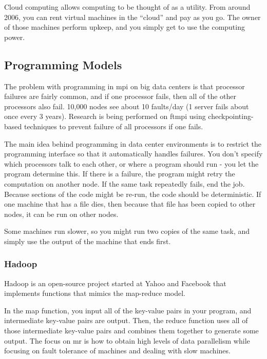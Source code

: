 \documentclass[10pt]{article}
\newcounter{subsubsubsection}[subsubsection]
\begin{document}
\begin{flushleft}
Cloud computing allows computing to be thought of as a utility. From around 2006, you can rent virtual machines in the ``cloud'' and pay as you go. The owner of those machines perform upkeep, and you simply get to use the computing power. 

\subsection{Programming Models}

The problem with programming in \gls{mpi} on big data centers is that processor failures are fairly common, and if one processor fails, then all of the other processors also fail. 10,000 nodes see about 10 faults/day (1 server fails about once every 3 years). Research is being performed on \gls{ftmpi} using checkpointing-based techniques to prevent failure of all processors if one fails.

The main idea behind programming in data center environments is to restrict the programming interface so that it automatically handles failures. You don't specify which processors talk to each other, or where a program should run - you let the program determine this. If there is a failure, the program might retry the computation on another node. If the same task repeatedly fails, end the job. Because sections of the code might be re-run, the code should be deterministic. If one machine that has a file dies, then because that file has been copied to other nodes, it can be run on other nodes. 

Some machines run slower, so you might run two copies of the same task, and simply use the output of the machine that ends first. 

\subsubsection{Hadoop}

Hadoop is an open-source project started at Yahoo and Facebook that implements functions that mimics the map-reduce model. 


In the map function, you input all of the key-value pairs in your program, and intermediate key-value pairs are output. Then, the reduce function uses all of those intermediate key-value pairs and combines them together to generate some output. The focus on \gls{mr} is how to obtain high levels of data parallelism while focusing on fault tolerance of machines and dealing with slow machines.


\end{flushleft}
\end{document}
